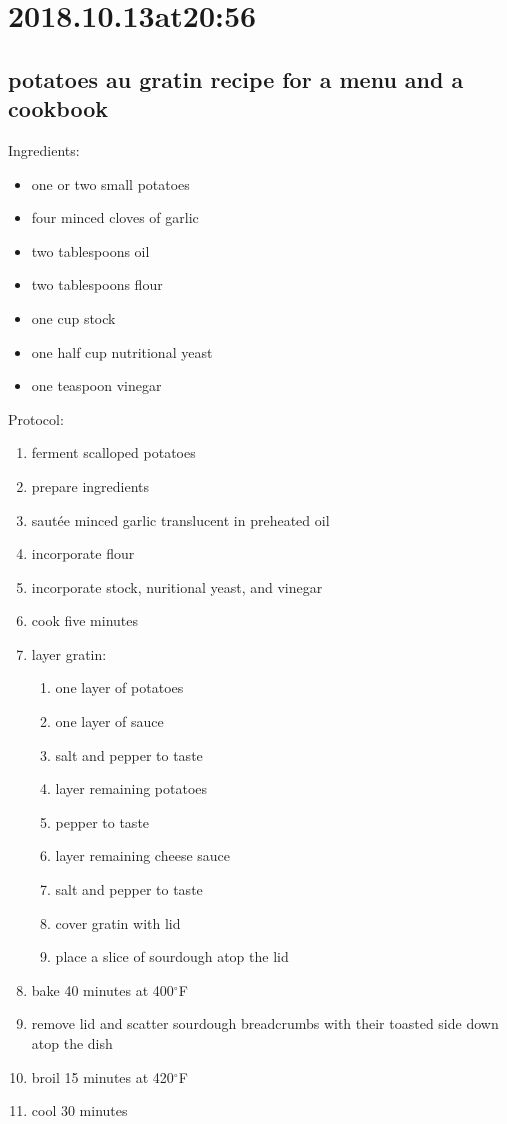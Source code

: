 \section*{ 2018.10.13at20:56 }
\subsection*{ potatoes au gratin recipe for a menu and a cookbook }
Ingredients:
\begin{itemize}
\item one or two small potatoes
\item four minced cloves of garlic
\item two tablespoons oil
\item two tablespoons flour
\item one cup stock
\item one half cup nutritional yeast
\item one teaspoon vinegar
\end{itemize}
Protocol:
\begin{enumerate}
\item ferment scalloped potatoes
\item prepare ingredients
\item saut\'ee minced garlic translucent in preheated oil
\item incorporate flour
\item incorporate stock, nuritional yeast, and vinegar
\item cook five minutes
\item layer gratin:
\begin{enumerate}
\item one layer of potatoes
\item one layer of sauce
\item salt and pepper to taste
\item layer remaining potatoes
\item pepper to taste
\item layer remaining cheese sauce
\item salt and pepper to taste
\item cover gratin with lid
\item place a slice of sourdough atop the lid
\end{enumerate}
\item bake 40 minutes at 400$^\circ$F
\item remove lid and scatter sourdough breadcrumbs with their toasted side down atop the dish 
\item broil 15 minutes at 420$^\circ$F
\item cool 30 minutes
\end{enumerate}

